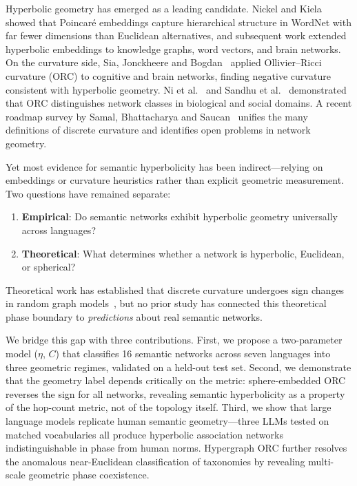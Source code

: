 \documentclass[11pt,a4paper]{article}
\begin{document}
Hyperbolic geometry has emerged as a leading candidate. Nickel and Kiela~\cite{nickel2017poincare} showed that Poincar\'e embeddings capture hierarchical structure in WordNet with far fewer dimensions than Euclidean alternatives, and subsequent work extended hyperbolic embeddings to knowledge graphs, word vectors, and brain networks. On the curvature side, Sia, Jonckheere and Bogdan~\cite{sia2021forman} applied Ollivier--Ricci curvature (ORC) to cognitive and brain networks, finding negative curvature consistent with hyperbolic geometry. Ni et al.~\cite{ni2015ricci} and Sandhu et al.~\cite{sandhu2015graph} demonstrated that ORC distinguishes network classes in biological and social domains. A recent roadmap survey by Samal, Bhattacharya and Saucan~\cite{samal2025roadmap} unifies the many definitions of discrete curvature and identifies open problems in network geometry.

Yet most evidence for semantic hyperbolicity has been indirect---relying on embeddings or curvature heuristics rather than explicit geometric measurement. Two questions have remained separate:
\begin{enumerate}
    \item \textbf{Empirical}: Do semantic networks exhibit hyperbolic geometry universally across languages?
    \item \textbf{Theoretical}: What determines whether a network is hyperbolic, Euclidean, or spherical?
\end{enumerate}

Theoretical work has established that discrete curvature undergoes sign changes in random graph models~\cite{mitsche2024curvature,bounded2025orc}, but no prior study has connected this theoretical phase boundary to \emph{predictions} about real semantic networks.

We bridge this gap with three contributions. First, we propose a two-parameter model ($\eta$, $C$) that classifies 16 semantic networks across seven languages into three geometric regimes, validated on a held-out test set. Second, we demonstrate that the geometry label depends critically on the metric: sphere-embedded ORC reverses the sign for all networks, revealing semantic hyperbolicity as a property of the hop-count metric, not of the topology itself. Third, we show that large language models replicate human semantic geometry---three LLMs tested on matched vocabularies all produce hyperbolic association networks indistinguishable in phase from human norms. Hypergraph ORC further resolves the anomalous near-Euclidean classification of taxonomies by revealing multi-scale geometric phase coexistence.
\end{document}
